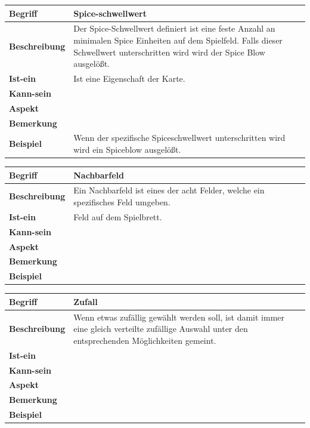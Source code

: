 \documentclass{uulm-assignment}
\newcounter{fa}
\begin{document}
\begin{tabularx}{16cm}{|l|X|}
\hline
\textbf{Begriff} & \textbf{Spice-schwellwert } \\
\hline
\textbf{Beschreibung} & Der Spice-Schwellwert definiert ist eine feste Anzahl an minimalen Spice Einheiten auf dem Spielfeld. Falls dieser Schwellwert unterschritten wird wird der Spice Blow ausgelößt. \\
\hline
\textbf{Ist-ein} & Ist eine Eigenschaft der Karte.\\
\hline
\textbf{Kann-sein} & \\
\hline
\textbf{Aspekt} &  \\
\hline
\textbf{Bemerkung} & \\
\hline
\textbf{Beispiel} & Wenn der spezifische Spiceschwellwert unterschritten wird wird ein Spiceblow ausgelößt. \\
\hline
\end{tabularx}

\begin{tabularx}{16cm}{|l|X|}
\hline
\textbf{Begriff} & \textbf{Nachbarfeld } \\
\hline
\textbf{Beschreibung} & Ein Nachbarfeld ist eines der acht Felder, welche ein spezifisches Feld umgeben. \\
\hline
\textbf{Ist-ein} & Feld auf dem Spielbrett. \\
\hline
\textbf{Kann-sein} & \\
\hline
\textbf{Aspekt} &  \\
\hline
\textbf{Bemerkung} & \\
\hline
\textbf{Beispiel} & \\
\hline
\end{tabularx}

\begin{tabularx}{16cm}{|l|X|}
\hline
\textbf{Begriff} & \textbf{Zufall  } \\
\hline
\textbf{Beschreibung} & Wenn etwas zufällig gewählt werden soll, ist damit immer eine gleich verteilte zufällige Auswahl unter den
entsprechenden Möglichkeiten gemeint. \\
\hline
\textbf{Ist-ein} & \\
\hline
\textbf{Kann-sein} & \\
\hline
\textbf{Aspekt} &  \\
\hline
\textbf{Bemerkung} & \\
\hline
\textbf{Beispiel} & \\
\hline
\end{tabularx}
\end{document}
